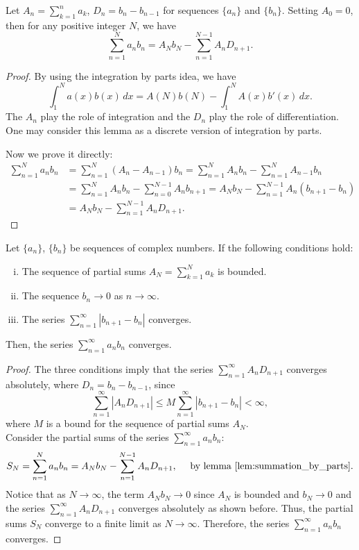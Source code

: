 \documentclass{elegantbook}
\begin{document}
\begin{lemma} \label{lem:summation_by_parts}
  Let $A_n = \sum_{k=1}^{n} a_k$, $D_n = b_{n} - b_{n-1}$ for sequences $\{a_n\}$ and $\{b_n\}$. Setting $A_0=0$, then for any positive integer $N$, we have
  \[
    \sum_{n=1}^{N} a_n b_n = A_N b_{N} - \sum_{n=1}^{N-1} A_n D_{n+1}.
  \]
\end{lemma}

\begin{proof}
  By using the integration by parts idea, we have
  \[
    \int^N_{1} a(x)b(x) \, dx = A(N)b(N) - \int^N_{1} A(x) b'(x) \, dx.
  \]
  The $A_n$ play the role of integration and the $D_n$ play the role of differentiation. One may consider this lemma as a discrete version of integration by parts.
  
  Now we prove it directly:
  \[
  \begin{aligned}
    \sum_{n=1}^{N} a_n b_n &= \sum_{n=1}^{N} (A_n - A_{n-1}) b_n  = \sum_{n=1}^{N} A_n b_n - \sum_{n=1}^{N} A_{n-1} b_n \\
    &= \sum_{n=1}^{N} A_n b_n - \sum_{n=0}^{N-1} A_n b_{n+1} = A_N b_N - \sum_{n=1}^{N-1} A_n (b_{n+1} - b_n) \\
    &= A_N b_N - \sum_{n=1}^{N-1} A_n D_{n+1}.
  \end{aligned}
  \]
\end{proof}

\begin{theorem} \label{thm:dirichlet_test_for_series_convergence}
  Let $\{a_n\}$, $\{b_n\}$ be sequences of complex numbers. If the following conditions hold:
  \begin{enumerate}[(i)]
    \item The sequence of partial sums $A_N = \sum_{k=1}^{N} a_k$ is bounded.
    \item The sequence $b_n\to 0$ as $n \to \infty$.
    \item The series $\sum_{n=1}^{\infty} |b_{n+1} - b_{n}|$ converges.
  \end{enumerate}
  Then, the series $\sum_{n=1}^{\infty} a_n b_n$ converges.
\end{theorem}

\begin{proof}
  The three conditions imply that the series $\sum_{n=1}^{\infty} A_n D_{n+1}$ converges absolutely, where $D_n = b_n - b_{n-1}$, since
  \[
    \sum_{n=1}^{\infty} |A_n D_{n+1}| \leq M \sum_{n=1}^{\infty} |b_{n+1} - b_n| < \infty,
  \]
  where $M$ is a bound for the sequence of partial sums $A_N$. \\
  Consider the partial sums of the series $\sum_{n=1}^{\infty} a_n b_n$:
  \[
    S_N = \sum_{n=1}^{N} a_n b_n = A_N b_N - \sum_{n=1}^{N-1} A_n D_{n+1}, \quad \text{ by lemma~\ref{lem:summation_by_parts}.}
  \]
  Notice that as $N \to \infty$, the term $A_N b_N \to 0$ since $A_N$ is bounded and $b_N \to 0$ and the series $\sum_{n=1}^{\infty} A_n D_{n+1}$ converges absolutely as shown before. Thus, the partial sums $S_N$ converge to a finite limit as $N \to \infty$. Therefore, the series $\sum_{n=1}^{\infty} a_n b_n$ converges.
\end{proof}
\end{document}
